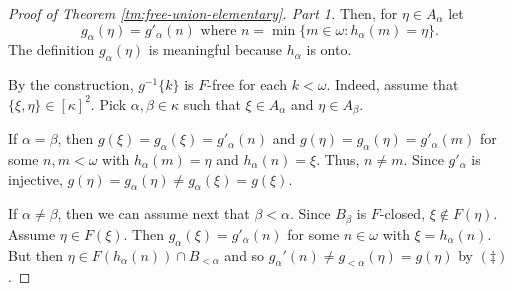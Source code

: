 \documentclass[a4paper,10pt,reqno]{amsart}
\numberwithin{equation}{section}
\theoremstyle{definition}
\theoremstyle{remark}
\begin{document}
\begin{proof}[Proof of Theorem \ref{tm:free-union-elementary}.  Part 1]
    
    Then, for ${\eta}\in A_{\alpha}$ let
    \begin{displaymath}
    g_{\alpha}({\eta})=g'_{\alpha}(n) \text{ where }
    n=\min\{m\in {\omega}:h_{\alpha}(m)={\eta}\}.
    \end{displaymath}
    The definition  $g_{\alpha}({\eta})$ is meaningful because $h_{\alpha}$ is onto. 
    
    By the construction, $g^{-1}\{k\}$ is $F$-free for each $k<{\omega}$.
    Indeed, assume that $\{{\xi},{\eta}\}\in {[{\kappa}]}^{2}$.
    Pick ${\alpha},{\beta}\in {\kappa}$ such that ${\xi}\in A_{\alpha}$ and ${\eta}\in A_{\beta}$.
    
    If ${\alpha}={\beta}$, then $g({\xi})=g_{\alpha}({\xi})=g'_{\alpha}(n)$
    and $g({\eta})=g_{\alpha}({\eta})=g'_{\alpha}(m)$ 
    for some $n,m<{\omega}$ with 
    $h_{\alpha}(m)={\eta}$ and $h_{\alpha}(n)={\xi}$. Thus, $n\ne m$. Since 
    $g'_{\alpha}$ is injective, 
    $g({\eta})=g_{\alpha}({\eta})\ne g_{\alpha}({\xi})=g({\xi})$.
    
    If ${\alpha}\ne {\beta}$, then we can assume next that ${\beta}< {\alpha}$. Since $B_{\beta}$ is $F$-closed,
    ${\xi}\notin F({\eta})$. 
    Assume  ${\eta}\in F({\xi})$. Then $g_{\alpha}({\xi})=g'_{\alpha}(n)$ for some 
    $n\in {\omega}$ with ${\xi}=h_{\alpha}(n)$.  But then  
    ${\eta}\in  F(h_{\alpha}(n))\cap B_{<{\alpha}}$
    and so $g_{\alpha}'(n)\ne g_{<{\alpha}}({\eta})=g({\eta})$ by $(\ddag)$.  
\end{proof}





    
    
  


    
    
\end{document}

